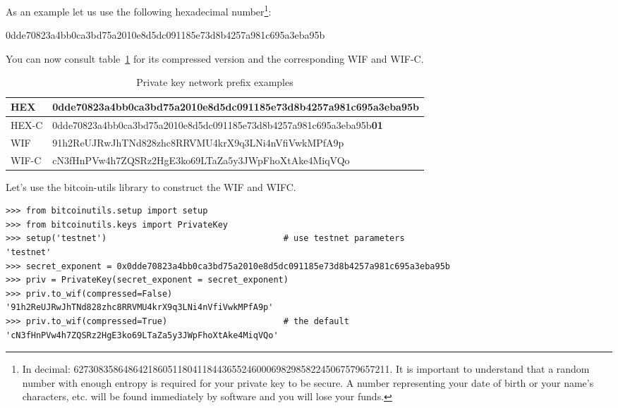 As an example let us use the following hexadecimal number\footnote{In decimal: 6273083586486421860511804118443655246000698298582245067579657211. It is important to understand that a random number with enough entropy is required for your private key to be secure. A number representing your date of birth or your name’s characters, etc. will be found immediately by software and you will lose your funds.}:

\begin{emphbox}
0dde70823a4bb0ca3bd75a2010e8d5dc091185e73d8b4257a981c695a3eba95b
\end{emphbox}

You can now consult table~\ref{tab:private-key-example} for its compressed version and the corresponding WIF and WIF-C.

\begin{table}[h]
\centering
\begin{tabular}{ |l|l| }
\hline
HEX & 0dde70823a4bb0ca3bd75a2010e8d5dc091185e73d8b4257a981c695a3eba95b \\
\hline
HEX-C & 0dde70823a4bb0ca3bd75a2010e8d5dc091185e73d8b4257a981c695a3eba95b\textbf{01} \\
\hline
WIF & 91h2ReUJRwJhTNd828zhc8RRVMU4krX9q3LNi4nVfiVwkMPfA9p \\
\hline
WIF-C & cN3fHnPVw4h7ZQSRz2HgE3ko69LTaZa5y3JWpFhoXtAke4MiqVQo \\
\hline
\end{tabular}
\caption{Private key network prefix examples}
\label{tab:private-key-example}
\end{table}

Let's use the bitcoin-utils library to construct the WIF and WIFC.

\vspace{1em}
\begin{lstlisting}[style=Python,label={lst:construct-wif},caption={Example of creating WIF and WIFC using Python},captionpos=b]
>>> from bitcoinutils.setup import setup
>>> from bitcoinutils.keys import PrivateKey
>>> setup('testnet')                                   # use testnet parameters
'testnet'
>>> secret_exponent = 0x0dde70823a4bb0ca3bd75a2010e8d5dc091185e73d8b4257a981c695a3eba95b
>>> priv = PrivateKey(secret_exponent = secret_exponent)
>>> priv.to_wif(compressed=False)
'91h2ReUJRwJhTNd828zhc8RRVMU4krX9q3LNi4nVfiVwkMPfA9p'
>>> priv.to_wif(compressed=True)                       # the default
'cN3fHnPVw4h7ZQSRz2HgE3ko69LTaZa5y3JWpFhoXtAke4MiqVQo'
\end{lstlisting}
\vspace{1em}

